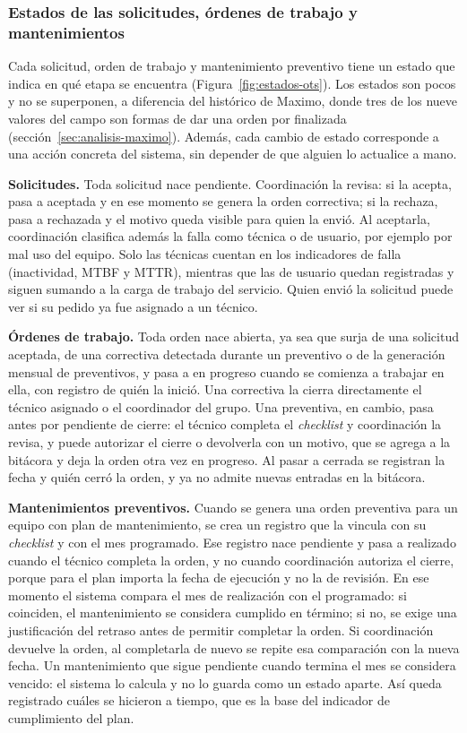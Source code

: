 \documentclass[10pt]{article}
\begin{document}
\subsubsection{Estados de las solicitudes, órdenes de trabajo y mantenimientos}
\label{sec:estados}

Cada solicitud, orden de trabajo y mantenimiento preventivo tiene un estado que indica en qué etapa se encuentra (Figura~\ref{fig:estados-ots}). Los estados son pocos y no se superponen, a diferencia del histórico de Maximo, donde tres de los nueve valores del campo son formas de dar una orden por finalizada (sección~\ref{sec:analisis-maximo}). Además, cada cambio de estado corresponde a una acción concreta del sistema, sin depender de que alguien lo actualice a mano.

\textbf{Solicitudes.} Toda solicitud nace pendiente. Coordinación la revisa: si la acepta, pasa a aceptada y en ese momento se genera la orden correctiva; si la rechaza, pasa a rechazada y el motivo queda visible para quien la envió. Al aceptarla, coordinación clasifica además la falla como técnica o de usuario, por ejemplo por mal uso del equipo. Solo las técnicas cuentan en los indicadores de falla (inactividad, MTBF y MTTR), mientras que las de usuario quedan registradas y siguen sumando a la carga de trabajo del servicio. Quien envió la solicitud puede ver si su pedido ya fue asignado a un técnico.

\textbf{Órdenes de trabajo.} Toda orden nace abierta, ya sea que surja de una solicitud aceptada, de una correctiva detectada durante un preventivo o de la generación mensual de preventivos, y pasa a en progreso cuando se comienza a trabajar en ella, con registro de quién la inició. Una correctiva la cierra directamente el técnico asignado o el coordinador del grupo. Una preventiva, en cambio, pasa antes por pendiente de cierre: el técnico completa el \textit{checklist} y coordinación la revisa, y puede autorizar el cierre o devolverla con un motivo, que se agrega a la bitácora y deja la orden otra vez en progreso. Al pasar a cerrada se registran la fecha y quién cerró la orden, y ya no admite nuevas entradas en la bitácora.

\textbf{Mantenimientos preventivos.} Cuando se genera una orden preventiva para un equipo con plan de mantenimiento, se crea un registro que la vincula con su \textit{checklist} y con el mes programado. Ese registro nace pendiente y pasa a realizado cuando el técnico completa la orden, y no cuando coordinación autoriza el cierre, porque para el plan importa la fecha de ejecución y no la de revisión. En ese momento el sistema compara el mes de realización con el programado: si coinciden, el mantenimiento se considera cumplido en término; si no, se exige una justificación del retraso antes de permitir completar la orden. Si coordinación devuelve la orden, al completarla de nuevo se repite esa comparación con la nueva fecha. Un mantenimiento que sigue pendiente cuando termina el mes se considera vencido: el sistema lo calcula y no lo guarda como un estado aparte. Así queda registrado cuáles se hicieron a tiempo, que es la base del indicador de cumplimiento del plan. 
\end{document}
